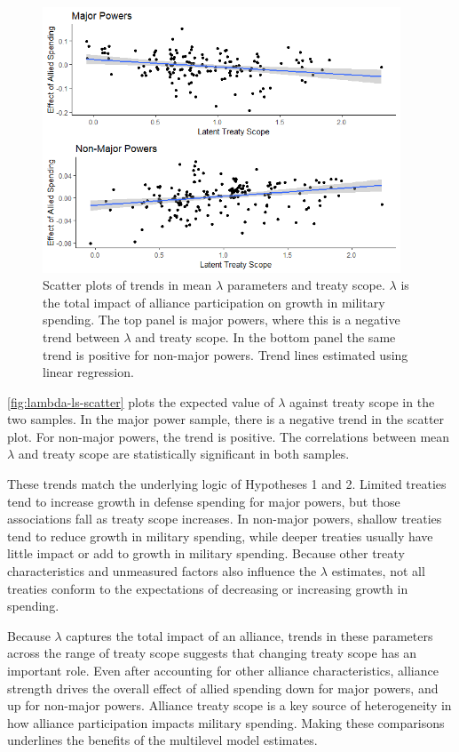 \documentclass[12pt]{article}
\begin{document}
\begin{figure}[htbp]
	\centering
		\includegraphics[width=0.95\textwidth]{../figures/lambda-ls-scatter.png}
	\caption{Scatter plots of trends in mean $\lambda$ parameters and treaty scope. $\lambda$ is the total impact of alliance participation on growth in military spending. The top panel is major powers, where this is a negative trend between $\lambda$ and treaty scope. In the bottom panel the same trend is positive for non-major powers. Trend lines estimated using linear regression.}
	\label{fig:lambda-ls-scatter}
\end{figure}


\autoref{fig:lambda-ls-scatter} plots the expected value of $\lambda$ against treaty scope in the two samples. 
In the major power sample, there is a negative trend in the scatter plot.
For non-major powers, the trend is positive.
The correlations between mean $\lambda$ and treaty scope are statistically significant in both samples. 


These trends match the underlying logic of Hypotheses 1 and 2. 
Limited treaties tend to increase growth in defense spending for major powers, but those associations fall as treaty scope increases. 
In non-major powers, shallow treaties tend to reduce growth in military spending, while deeper treaties usually have little impact or add to growth in military spending. 
Because other treaty characteristics and unmeasured factors also influence the $\lambda$ estimates, not all treaties conform to the expectations of decreasing or increasing growth in spending. 


Because $\lambda$ captures the total impact of an alliance, trends in these parameters across the range of treaty scope suggests that changing treaty scope has an important role. 
Even after accounting for other alliance characteristics, alliance strength drives the overall effect of allied spending down for major powers, and up for non-major powers. 
Alliance treaty scope is a key source of heterogeneity in how alliance participation impacts military spending. 
Making these comparisons underlines the benefits of the multilevel model estimates. 
\end{document}
